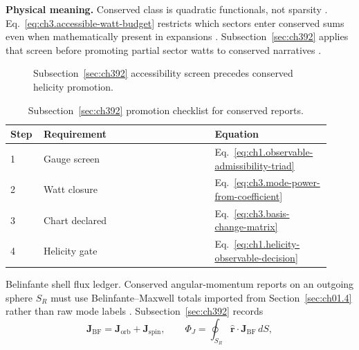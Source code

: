 \textbf{Physical meaning.} Conserved class is quadratic functionals, not sparsity \cite{stratton1941}.
Eq.~\eqref{eq:ch3.accessible-watt-budget} restricts which sectors enter conserved sums even when mathematically present in expansions
\cite{harrington2001}. Subsection~\ref{sec:ch392} applies that screen before promoting partial sector watts to conserved
narratives \cite{hansen1988}.
\begin{figure}[t]
\centering
{}
\caption{Subsection~\ref{sec:ch392} accessibility screen precedes conserved helicity promotion.}
\label{fig:ch3.392-accessibility-hel}
\end{figure}
\begin{table}[t]
\centering
\caption{Subsection~\ref{sec:ch392} promotion checklist for conserved reports.}
\label{tab:ch3.392-promotion-checklist}
\small
\begin{tabular}{@{}p{0.08\linewidth}p{0.50\linewidth}p{0.34\linewidth}@{}}
\toprule
Step & Requirement & Equation \\
\midrule
1 & Gauge screen & Eq.~\eqref{eq:ch1.observable-admissibility-triad} \\
2 & Watt closure & Eq.~\eqref{eq:ch3.mode-power-from-coefficient} \\
3 & Chart declared & Eq.~\eqref{eq:ch3.basis-change-matrix} \\
4 & Helicity gate & Eq.~\eqref{eq:ch1.helicity-observable-decision} \\
\bottomrule
\end{tabular}
\end{table}
Belinfante shell flux ledger. Conserved angular-momentum reports on an outgoing sphere \(S_{R}\) must use Belinfante--Maxwell totals imported from
Section~\ref{sec:ch01.4} rather than raw mode labels \cite{belinfante1940}. Subsection~\ref{sec:ch392} records
\begin{equation}
\label{eq:ch3.belinfante-shell-flux-ledger}
\mathbf{J}_{\mathrm{BF}}
=
\mathbf{J}_{\mathrm{orb}}
+
\mathbf{J}_{\mathrm{spin}},
\qquad
\Phi_{J}
=
\oint_{S_{R}}
\hat{\mathbf{r}}\cdot\mathbf{J}_{\mathrm{BF}}\,dS,
\end{equation}
